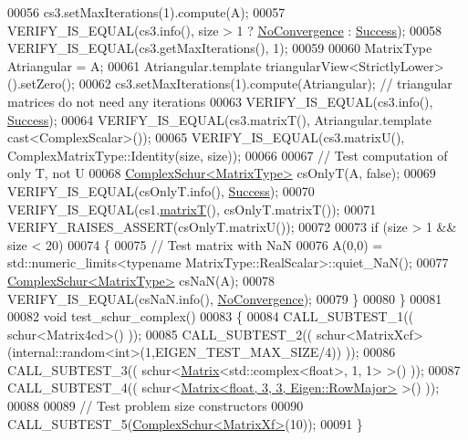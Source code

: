 \begin{DoxyCode}
00056   cs3.setMaxIterations(1).compute(A);
00057   VERIFY\_IS\_EQUAL(cs3.info(), size > 1 ? \hyperlink{group__enums_gga85fad7b87587764e5cf6b513a9e0ee5eaba1c8763d1179778070f365ecc4157a8}{NoConvergence} : \hyperlink{group__enums_gga85fad7b87587764e5cf6b513a9e0ee5ea52581b035f4b59c203b8ff999ef5fcea}{Success});
00058   VERIFY\_IS\_EQUAL(cs3.getMaxIterations(), 1);
00059 
00060   MatrixType Atriangular = A;
00061   Atriangular.template triangularView<StrictlyLower>().setZero(); 
00062   cs3.setMaxIterations(1).compute(Atriangular); \textcolor{comment}{// triangular matrices do not need any iterations}
00063   VERIFY\_IS\_EQUAL(cs3.info(), \hyperlink{group__enums_gga85fad7b87587764e5cf6b513a9e0ee5ea52581b035f4b59c203b8ff999ef5fcea}{Success});
00064   VERIFY\_IS\_EQUAL(cs3.matrixT(), Atriangular.template cast<ComplexScalar>());
00065   VERIFY\_IS\_EQUAL(cs3.matrixU(), ComplexMatrixType::Identity(size, size));
00066 
00067   \textcolor{comment}{// Test computation of only T, not U}
00068   \hyperlink{group___eigenvalues___module}{ComplexSchur<MatrixType>} csOnlyT(A, \textcolor{keyword}{false});
00069   VERIFY\_IS\_EQUAL(csOnlyT.info(), \hyperlink{group__enums_gga85fad7b87587764e5cf6b513a9e0ee5ea52581b035f4b59c203b8ff999ef5fcea}{Success});
00070   VERIFY\_IS\_EQUAL(cs1.\hyperlink{group___eigenvalues___module_add3ab5ed83f7f2f06b79fa910a2d5684}{matrixT}(), csOnlyT.matrixT());
00071   VERIFY\_RAISES\_ASSERT(csOnlyT.matrixU());
00072 
00073   \textcolor{keywordflow}{if} (size > 1 && size < 20)
00074   \{
00075     \textcolor{comment}{// Test matrix with NaN}
00076     A(0,0) = std::numeric\_limits<typename MatrixType::RealScalar>::quiet\_NaN();
00077     \hyperlink{group___eigenvalues___module}{ComplexSchur<MatrixType>} csNaN(A);
00078     VERIFY\_IS\_EQUAL(csNaN.info(), \hyperlink{group__enums_gga85fad7b87587764e5cf6b513a9e0ee5eaba1c8763d1179778070f365ecc4157a8}{NoConvergence});
00079   \}
00080 \}
00081 
00082 \textcolor{keywordtype}{void} test\_schur\_complex()
00083 \{
00084   CALL\_SUBTEST\_1(( schur<Matrix4cd>() ));
00085   CALL\_SUBTEST\_2(( schur<MatrixXcf>(internal::random<int>(1,EIGEN\_TEST\_MAX\_SIZE/4)) ));
00086   CALL\_SUBTEST\_3(( schur<\hyperlink{group___core___module_class_eigen_1_1_matrix}{Matrix}<std::complex<float>, 1, 1> >() ));
00087   CALL\_SUBTEST\_4(( schur<\hyperlink{group___core___module_class_eigen_1_1_matrix}{Matrix<float, 3, 3, Eigen::RowMajor>} >() ));
00088 
00089   \textcolor{comment}{// Test problem size constructors}
00090   CALL\_SUBTEST\_5(\hyperlink{group___eigenvalues___module_class_eigen_1_1_complex_schur}{ComplexSchur<MatrixXf>}(10));
00091 \}
\end{DoxyCode}
